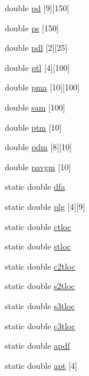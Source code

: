 \begin{DoxyCompactItemize}
\item 
double \hyperlink{nrlmsise-00_8c_a9d7bc0edd2bc401a23d0bb6bbdcc261d}{pd} \mbox{[}9\mbox{]}\mbox{[}150\mbox{]}
\item 
double \hyperlink{nrlmsise-00_8c_ad4f203c6cf70efc738b56d4377ded829}{ps} \mbox{[}150\mbox{]}
\item 
double \hyperlink{nrlmsise-00_8c_adefb8cc23535073a700d4009d0343679}{pdl} \mbox{[}2\mbox{]}\mbox{[}25\mbox{]}
\item 
double \hyperlink{nrlmsise-00_8c_a34941bdba8aa11fb952a012ae87fd02c}{ptl} \mbox{[}4\mbox{]}\mbox{[}100\mbox{]}
\item 
double \hyperlink{nrlmsise-00_8c_afc39d71d3e372c3178c33a31ee91d713}{pma} \mbox{[}10\mbox{]}\mbox{[}100\mbox{]}
\item 
double \hyperlink{nrlmsise-00_8c_ae391523526f8ec527742657b4f50db0e}{sam} \mbox{[}100\mbox{]}
\item 
double \hyperlink{nrlmsise-00_8c_a8574f50c26935273fba0f37212f7eb97}{ptm} \mbox{[}10\mbox{]}
\item 
double \hyperlink{nrlmsise-00_8c_ac7ac86294545f793edad8b9574d73132}{pdm} \mbox{[}8\mbox{]}\mbox{[}10\mbox{]}
\item 
double \hyperlink{nrlmsise-00_8c_ad9e05d1fb99e07d634b35cdde6c978dc}{pavgm} \mbox{[}10\mbox{]}
\item 
static double \hyperlink{nrlmsise-00_8c_ad73a5e2e20f577ed77653eb51b7327ff}{dfa}
\item 
static double \hyperlink{nrlmsise-00_8c_ae88729d6c4d0930c73a130b2a9b9407c}{plg} \mbox{[}4\mbox{]}\mbox{[}9\mbox{]}
\item 
static double \hyperlink{nrlmsise-00_8c_a4e83b83fb0481b147c5edd139cb0158b}{ctloc}
\item 
static double \hyperlink{nrlmsise-00_8c_a0f4f8372d2da884c4eb58ae9135f4013}{stloc}
\item 
static double \hyperlink{nrlmsise-00_8c_a03ff47cbc5b206133c0c6cca19f54eaa}{c2tloc}
\item 
static double \hyperlink{nrlmsise-00_8c_a5b45e3666a7664914c9cdf3abb476960}{s2tloc}
\item 
static double \hyperlink{nrlmsise-00_8c_a82a48eaf6f5edce5fa25a760e18a5c04}{s3tloc}
\item 
static double \hyperlink{nrlmsise-00_8c_a5078d8de77665cc0dcaa7e2ecd20d9a6}{c3tloc}
\item 
static double \hyperlink{nrlmsise-00_8c_a70bc40d53750a0de2cd687b7172660bc}{apdf}
\item 
static double \hyperlink{nrlmsise-00_8c_ae2e227d16dce2a7b3989c8f5bcd6cf08}{apt} \mbox{[}4\mbox{]}
\end{DoxyCompactItemize}


